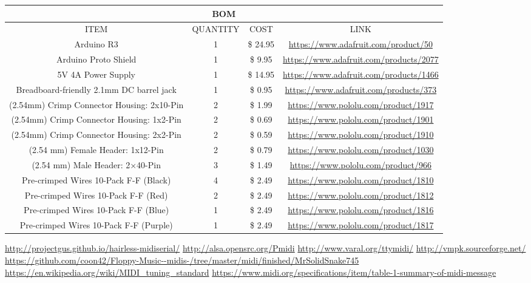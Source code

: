 \documentclass[11pt, a4paper]{report}
\begin{document}
\footnotesize{
\label{fig:BOM}
\begin{center}
 \begin{tabular}{|c | c | c | c |} 
 \hline
  \multicolumn{4}{|c|}{BOM} \\ 
 \hline
 ITEM & QUANTITY & COST & LINK \\
 \hline
 Arduino R3 & 1 & \$ 24.95 & \url{https://www.adafruit.com/product/50} \\
 \hline
 Arduino Proto Shield & 1 & \$ 9.95 & \url{https://www.adafruit.com/products/2077} \\
 \hline
 5V 4A Power Supply & 1 & \$ 14.95 & \url{https://www.adafruit.com/products/1466} \\
 \hline
 Breadboard-friendly 2.1mm DC barrel jack & 1 & \$ 0.95 & \url{https://www.adafruit.com/products/373} \\
 \hline
 (2.54mm) Crimp Connector Housing: 2x10-Pin & 2 & \$ 1.99 &  \url{https://www.pololu.com/product/1917} \\
 \hline
  (2.54mm) Crimp Connector Housing: 1x2-Pin & 2 & \$ 0.69 & \url{https://www.pololu.com/product/1901}\\
  \hline
  (2.54mm) Crimp Connector Housing: 2x2-Pin & 2 & \$ 0.59 & \url{https://www.pololu.com/product/1910}\\
 \hline
  (2.54 mm) Female Header: 1x12-Pin & 2 & \$ 0.79 & \url{https://www.pololu.com/product/1030}\\
  \hline
  (2.54 mm) Male Header: 2×40-Pin & 3 & \$ 1.49 & \url{https://www.pololu.com/product/966}\\
  \hline
   Pre-crimped Wires 10-Pack F-F (Black) & 4 & \$ 2.49 & \url{https://www.pololu.com/product/1810}\\
  \hline 
   Pre-crimped Wires 10-Pack F-F (Red) & 2 & \$ 2.49 & \url{https://www.pololu.com/product/1812}\\
  \hline 
   Pre-crimped Wires 10-Pack F-F (Blue) & 1 & \$ 2.49 & \url{https://www.pololu.com/product/1816}\\
  \hline 
   Pre-crimped Wires 10-Pack F-F (Purple) & 1 & \$ 2.49 & \url{https://www.pololu.com/product/1817}\\
  \hline

\end{tabular}
\end{center}
}

\begin{thebibliography}{9}
\url{http://projectgus.github.io/hairless-midiserial/}
\url{http://alsa.opensrc.org/Pmidi}
\url{http://www.varal.org/ttymidi/}
\url{http://vmpk.sourceforge.net/}
\url{https://github.com/coon42/Floppy-Music--midis-/tree/master/midi/finished/MrSolidSnake745}
\url{https://en.wikipedia.org/wiki/MIDI_tuning_standard}
\url{https://www.midi.org/specifications/item/table-1-summary-of-midi-message}
\end{thebibliography}
\end{document}
